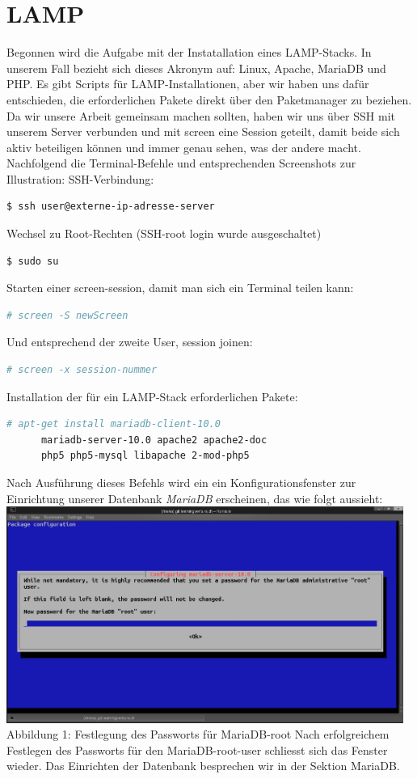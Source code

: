 \documentclass{article}
\begin{document}
	\section{LAMP}
	Begonnen wird die Aufgabe mit der Instatallation eines LAMP-Stacks. In unserem Fall bezieht sich dieses Akronym auf: Linux, Apache, MariaDB und PHP. Es gibt Scripts für LAMP-Installationen, aber wir haben uns dafür entschieden, die erforderlichen Pakete direkt über den Paketmanager zu beziehen. Da wir unsere Arbeit gemeinsam machen sollten, haben wir uns über SSH mit unserem Server verbunden und mit screen eine Session geteilt, damit beide sich aktiv beteiligen können und immer genau sehen, was der andere macht. Nachfolgend die Terminal-Befehle und entsprechenden Screenshots zur Illustration:
	\linebreak
	SSH-Verbindung:
	\begin{lstlisting}[language=bash]
	$ ssh user@externe-ip-adresse-server
	\end{lstlisting}
	Wechsel zu Root-Rechten (SSH-root login wurde ausgeschaltet)
	\begin{lstlisting}[language=bash]
	$ sudo su
	\end{lstlisting}
	Starten einer screen-session, damit man sich ein Terminal teilen kann:
	\begin{lstlisting}[language=bash]
	# screen -S newScreen
	\end{lstlisting}
	Und entsprechend der zweite User, session joinen:
	\begin{lstlisting}[language=bash]
	# screen -x session-nummer
	\end{lstlisting}
	Installation der für ein LAMP-Stack erforderlichen Pakete:
	\begin{lstlisting}[language=bash]
	# apt-get install mariadb-client-10.0
	  mariadb-server-10.0 apache2 apache2-doc 
	  php5 php5-mysql libapache 2-mod-php5
	\end{lstlisting}
	Nach Ausführung dieses Befehls wird ein ein Konfigurationsfenster zur Einrichtung unserer Datenbank \textit{MariaDB} erscheinen, das wie folgt aussieht:
	\newline
	\newline
	\includegraphics[width=13cm]{../Pics/3-lamp-stack-mariadb}
	Abbildung 1: Festlegung des Passworts für MariaDB-root
	\newline
	\newline
	Nach erfolgreichem Festlegen des Passworts für den MariaDB-root-user schliesst sich das Fenster wieder. Das Einrichten der Datenbank besprechen wir in der Sektion MariaDB.
\end{document}
